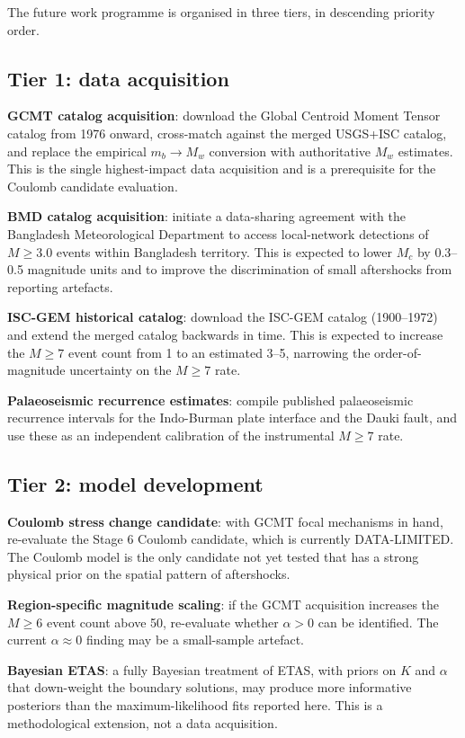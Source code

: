 \documentclass[10pt,a4paper,twocolumn]{article}
\begin{document}
The future work programme is organised in three tiers, in descending priority order.

\subsection{Tier 1: data acquisition}

\textbf{GCMT catalog acquisition}: download the Global Centroid Moment Tensor catalog from 1976 onward, cross-match against the merged USGS+ISC catalog, and replace the empirical $m_b\to M_w$ conversion with authoritative $M_w$ estimates. This is the single highest-impact data acquisition and is a prerequisite for the Coulomb candidate evaluation.

\textbf{BMD catalog acquisition}: initiate a data-sharing agreement with the Bangladesh Meteorological Department to access local-network detections of $M\geq3.0$ events within Bangladesh territory. This is expected to lower $M_c$ by 0.3--0.5 magnitude units and to improve the discrimination of small aftershocks from reporting artefacts.

\textbf{ISC-GEM historical catalog}: download the ISC-GEM catalog (1900--1972) and extend the merged catalog backwards in time. This is expected to increase the $M\geq7$ event count from 1 to an estimated 3--5, narrowing the order-of-magnitude uncertainty on the $M\geq7$ rate.

\textbf{Palaeoseismic recurrence estimates}: compile published palaeoseismic recurrence intervals for the Indo-Burman plate interface and the Dauki fault, and use these as an independent calibration of the instrumental $M\geq7$ rate.

\subsection{Tier 2: model development}

\textbf{Coulomb stress change candidate}: with GCMT focal mechanisms in hand, re-evaluate the Stage 6 Coulomb candidate, which is currently DATA-LIMITED. The Coulomb model is the only candidate not yet tested that has a strong physical prior on the spatial pattern of aftershocks.

\textbf{Region-specific magnitude scaling}: if the GCMT acquisition increases the $M\geq6$ event count above 50, re-evaluate whether $\alpha>0$ can be identified. The current $\alpha\approx0$ finding may be a small-sample artefact.

\textbf{Bayesian ETAS}: a fully Bayesian treatment of ETAS, with priors on $K$ and $\alpha$ that down-weight the boundary solutions, may produce more informative posteriors than the maximum-likelihood fits reported here. This is a methodological extension, not a data acquisition.
\end{document}
